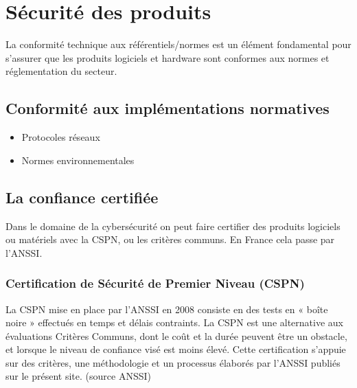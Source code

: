 

\section{Sécurité des produits}

La conformité technique aux référentiels/normes est un élément fondamental pour s'assurer que les produits logiciels et hardware sont conformes aux normes et réglementation du secteur.

\subsection{Conformité aux implémentations normatives}
\begin{itemize}
	\item Protocoles réseaux
	\item Normes environnementales
\end{itemize}

\subsection{La confiance certifiée}

Dans le domaine de la cybersécurité on peut faire certifier des produits logiciels ou matériels avec la CSPN, ou les critères communs. En France cela passe par l'ANSSI.

\subsubsection{Certification de Sécurité de Premier Niveau (CSPN)}
La CSPN mise en place par l’ANSSI en 2008 consiste en des tests en « boîte noire » effectués en temps et délais contraints. La CSPN est une alternative aux évaluations Critères Communs, dont le coût et la durée peuvent être un obstacle, et lorsque le niveau de confiance visé est moins élevé. Cette certification s’appuie sur des critères, une méthodologie et un processus élaborés par l’ANSSI publiés sur le présent site.
(source ANSSI)

